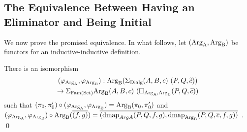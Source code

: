 \documentclass[orivec,envcountsame, ,envcountsect]{llncs}
\begin{document}
\subsection{The Equivalence Between Having an Eliminator and Being Initial}
\label{sec:elim-init-equiv}

We now prove the promised equivalence. In what follows, let $(\text{Arg}_{\text{A}},
\text{Arg}_{\text{B}})$ be functors for an inductive-inductive definition.

\begin{lemma}
\label{thm:isoArgAB}
  There is an isomorphism
\begin{multline*}
(\varphi_{\text{Arg}_{\text{A}}}, \varphi_{\text{Arg}_{\text{B}}}) : \text{Arg}_{\text{B}}(\Sigma_{\text{Dialg}} (A, B, c)\ (P, Q, \widetilde{c})) \\
  \to \Sigma_{\text{Fam}(\text{Set})} \text{Arg}_{\text{B}}(A, B, c)\ (\Box_{\text{Arg}_{\text{A}}, \text{Arg}_{\text{B}}}(P, Q, \widetilde{c})) 
\end{multline*}
such that $(\pi_0, \pi'_0) \circ (\varphi_{\text{Arg}_{\text{A}}}, \varphi_{\text{Arg}_{\text{B}}}) =
\text{Arg}_{\text{B}}(\pi_0, \pi'_0)$ and $(\varphi_{\text{Arg}_{\text{A}}}, \varphi_{\text{Arg}_{\text{B}}}) \circ
\text{Arg}_{\text{B}}(\overline{(f, g)}) = \overline{(\text{dmap}_{ArgA}(P, Q, f, g),
  \text{dmap}_{\text{Arg}_{\text{B}}}(P, Q, \overline{c}, f, g))}$ .  \qed
\end{lemma}
\end{document}
